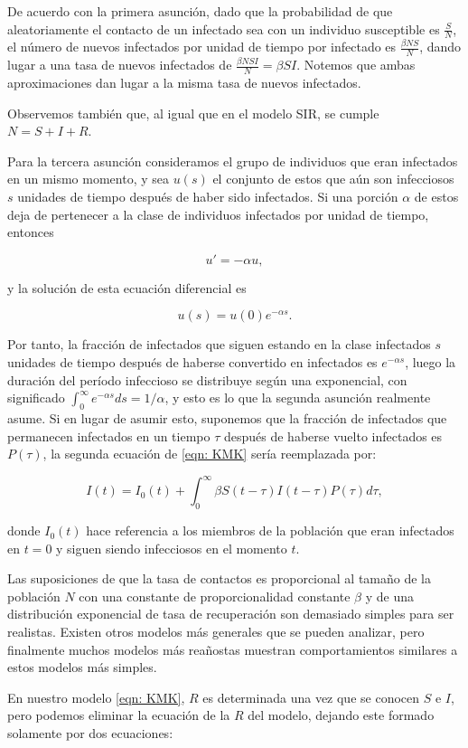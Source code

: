 De acuerdo con la primera asunción, dado que la probabilidad de que aleatoriamente el contacto de un infectado sea con un individuo susceptible es $\frac{S}{N}$, el número de nuevos infectados por unidad de tiempo por infectado es $\frac{\beta NS}{N}$, dando lugar a una tasa de nuevos infectados de $\frac{\beta  N S I}{N}=\beta SI$. Notemos que ambas aproximaciones dan lugar a la misma tasa de nuevos infectados.

Observemos también que, al igual que en el modelo SIR, se cumple $N=S+I+R$.

Para la tercera asunción consideramos el grupo de individuos que eran infectados en un mismo momento, y sea $u(s)$ el conjunto de estos que aún son infecciosos $s$ unidades de tiempo después de haber sido infectados. Si una porción $\alpha$ de estos deja de pertenecer a la clase de individuos infectados por unidad de tiempo, entonces

$$u'=-\alpha u,$$

y la solución de esta ecuación diferencial es

$$u(s)=u(0)e^{-\alpha s}.$$

Por tanto, la fracción de infectados que siguen estando en la clase infectados $s$ unidades de tiempo después de haberse convertido en infectados es $e^{-\alpha s}$, luego la duración del período infeccioso se distribuye según una exponencial, con significado $\int_0^\infty e^{-\alpha s}ds=1/\alpha$, y esto es lo que la segunda asunción realmente asume. Si en lugar de asumir esto, suponemos que la fracción de infectados que permanecen infectados en un tiempo $\tau$ después de haberse vuelto infectados es $P(\tau )$, la segunda ecuación de \eqref{eqn: KMK} sería reemplazada por:

$$I(t)=I_0(t)+\int_0^\infty \beta S(t-\tau )I(t-\tau )P(\tau ) d\tau ,$$

donde $I_0(t)$ hace referencia a los miembros de la población que eran infectados en $t=0$ y siguen siendo infecciosos en el momento $t$.

Las suposiciones de que la tasa de contactos es proporcional al tamaño de la población $N$ con una constante de proporcionalidad constante $\beta$ y de una distribución exponencial de tasa de recuperación son demasiado simples para ser realistas. Existen otros modelos más generales que se pueden analizar, pero finalmente muchos modelos más reañostas muestran comportamientos similares a estos modelos más simples.

En nuestro modelo \eqref{eqn: KMK}, $R$ es determinada una vez que se conocen $S$ e $I$, pero podemos eliminar la ecuación de la $R$ del modelo, dejando este formado solamente por dos ecuaciones:

